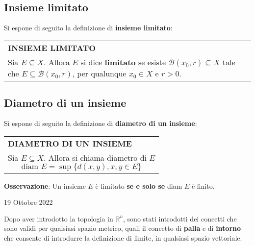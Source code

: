 \documentclass[a4paper]{extarticle}
\renewcommand\arraystretch{}
\begin{document}
\vspace{1em}
\noindent
\subsection{Insieme limitato}
Si espone di seguito la definizione di \textbf{insieme limitato}:

\vspace{1em}
\setlength{\tabcolsep}{14pt}
\renewcommand{\arraystretch}{2}
\noindent
\begin{tabularx}{\textwidth}{@{}|P|@{}}
    \hline
    {\textbf{INSIEME LIMITATO}}\\
    \parbox{\linewidth}{Sia $E \subseteq X$. Allora $E$ si dice \textbf{limitato} se esiste $\mathcal{B}(x_0,r) \subseteq X$ tale che $E \subseteq \mathcal{B}(x_0,r)$, per qualunque $x_0 \in X$ e $r>0$.
    \vspace{3mm}}\\
    \hline
\end{tabularx}

\vspace{1em}
\noindent
\subsection{Diametro di un insieme}
Si espone di seguito la definizione di \textbf{diametro di un insieme}:

\vspace{1em}
\setlength{\tabcolsep}{14pt}
\renewcommand{\arraystretch}{2}
\noindent
\begin{tabularx}{\textwidth}{@{}|P|@{}}
    \hline
    {\textbf{DIAMETRO DI UN INSIEME}}\\
    \parbox{\linewidth}{Sia $E \subseteq X$. Allora si chiama diametro di $E$
    \[\text{diam } E = \sup \{d(x,y), x,y \in E\}\]
    \vspace{-3mm}}\\
    \hline
\end{tabularx}

\vspace{2em}
\noindent
\textbf{Osservazione}: Un insieme $E$ è limitato \textbf{se e solo se} diam $E$ è finito.

\newpage
\begin{center}
    19 Ottobre 2022
\end{center}
Dopo aver introdotto la topologia in $\mathbb{R}^n$, sono stati introdotti dei concetti che sono validi per qualsiasi spazio metrico, quali il concetto di \textbf{palla} e di \textbf{intorno} che consente di introdurre la definizione di limite, in qualsiasi spazio vettoriale.
\end{document}
